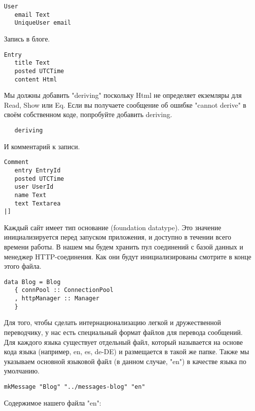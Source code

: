 \begin{lstlisting}
User
   email Text
   UniqueUser email
\end{lstlisting}
 
Запись в блоге. 
 
\begin{lstlisting}
Entry
   title Text
   posted UTCTime
   content Html
\end{lstlisting}
 
Мы должны добавить "deriving" поскольку Html не определяет екземляры для Read, Show или Eq. Если вы получаете сообщение об ошибке "cannot derive" в своём собственном коде, попробуйте добавить deriving.
 
\begin{lstlisting}
   deriving
\end{lstlisting}
 
И комментарий к записи. 
 
\begin{lstlisting}
Comment
   entry EntryId
   posted UTCTime
   user UserId
   name Text
   text Textarea
|]
\end{lstlisting}
 
Каждый сайт имеет тип основание (foundation datatype). Это значение инициализируется перед запуском приложения, и доступно в течении всего времени работы. В нашем мы будем хранить пул соединений с базой данных и менеджер HTTP-соединения. Как они будут инициализированы смотрите в конце этого файла.
 
\begin{lstlisting}
data Blog = Blog
   { connPool :: ConnectionPool
   , httpManager :: Manager
   }
\end{lstlisting}
 
Для того, чтобы сделать интернационализацию легкой и дружественной переводчику, у нас есть специальный формат файлов для перевода сообщений. Для каждого языка существует отдельный файл, который называется на основе кода языка (например, en, es, de-DE) и размещается в такой же папке. Также мы указываем основной языковой файл (в данном случае, "en") в качестве языка по умолчанию.
 
\begin{lstlisting}
mkMessage "Blog" "../messages-blog" "en"
\end{lstlisting}
 
Содержимое нашего файла "en": 

